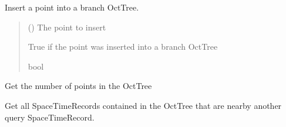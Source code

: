 \documentclass[letterpaper,10pt,english]{sphinxmanual}
\begin{document}
\begin{fulllineitems}
\begin{fulllineitems}
\label{\detokenize{octtree:geotrees.octtree.OctTree.insert_into_branch}}
\pysigstartsignatures
\pysiglinewithargsret
{}
{}
{}
\pysigstopsignatures
\sphinxAtStartPar
Insert a point into a branch OctTree.
\begin{quote}\begin{description}
\sphinxAtStartPar
{} ({\hyperref[\detokenize{record:geotrees.record.SpaceTimeRecord}]{}}) \textendash{} The point to insert

\sphinxAtStartPar
True if the point was inserted into a branch OctTree

\sphinxAtStartPar
bool

\end{description}\end{quote}

\end{fulllineitems}


\begin{fulllineitems}
\label{\detokenize{octtree:geotrees.octtree.OctTree.len}}
\pysigstartsignatures
\pysiglinewithargsret
{}
{}
{}
\pysigstopsignatures
\sphinxAtStartPar
Get the number of points in the OctTree
\begin{quote}\begin{description}
\sphinxAtStartPar
{}

\end{description}\end{quote}

\end{fulllineitems}


\begin{fulllineitems}
\label{\detokenize{octtree:geotrees.octtree.OctTree.nearby_points}}
\pysigstartsignatures
\pysiglinewithargsret
{}
{\sphinxparamcomma {}\sphinxparamcomma {}\sphinxparamcomma {}\sphinxparamcomma {}}
{}
\pysigstopsignatures
\sphinxAtStartPar
Get all SpaceTimeRecords contained in the OctTree that are nearby
another query SpaceTimeRecord.


\end{fulllineitems}
\end{fulllineitems}
\end{document}
